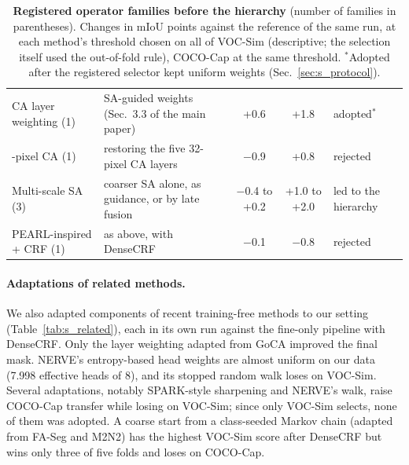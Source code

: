 \documentclass[10pt,twocolumn,letterpaper]{article}
\begin{document}
\begin{table}[t]
\begin{tabular}{@{}>{\raggedright\arraybackslash}p{3.6cm}>{\raggedright\arraybackslash}p{6.6cm}cc>{\raggedright\arraybackslash}p{2.3cm}@{}}
CA layer weighting (1) & SA-guided weights (Sec.~3.3 of the main paper) & +0.6 & +1.8 & adopted$^\ast$ \\
32-pixel CA (1) & restoring the five 32-pixel CA layers & $-$0.9 & +0.8 & rejected \\
Multi-scale SA (3) & coarser SA alone, as guidance, or by late fusion & $-$0.4 to +0.2 & +1.0 to +2.0 & led to the hierarchy \\
PEARL-inspired + CRF (1) & as above, with DenseCRF & $-$0.1 & $-$0.8 & rejected \\
\bottomrule
\end{tabular}
\caption{\textbf{Registered operator families before the hierarchy} (number of families in parentheses). Changes in mIoU points against the reference of the same run, at each method's threshold chosen on all of VOC-Sim (descriptive; the selection itself used the out-of-fold rule), COCO-Cap at the same threshold. $^\ast$Adopted after the registered selector kept uniform weights (Sec.~\ref{sec:s_protocol}).}
\label{tab:s_families}
\end{table}

\paragraph{Adaptations of related methods.}
We also adapted components of recent training-free methods to our setting (Table~\ref{tab:s_related}), each in its own run against the fine-only pipeline with DenseCRF. Only the layer weighting adapted from GoCA improved the final mask. NERVE's entropy-based head weights are almost uniform on our data (7.998 effective heads of 8), and its stopped random walk loses on VOC-Sim. Several adaptations, notably SPARK-style sharpening and NERVE's walk, raise COCO-Cap transfer while losing on VOC-Sim; since only VOC-Sim selects, none of them was adopted. A coarse start from a class-seeded Markov chain (adapted from FA-Seg and M2N2) has the highest VOC-Sim score after DenseCRF but wins only three of five folds and loses on COCO-Cap.
\end{document}
